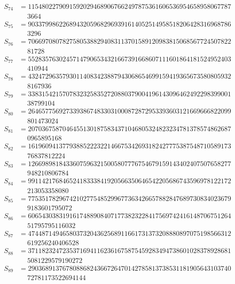 \begin{align*}
S_{74} &= 11548022790915920294689067662497875361606536954658958067787 \\
    &\quad\ 3664\\
S_{75} &= 90337998622689432059682969391614052514958518206428316968786 \\
    &\quad\ 3296\\
S_{76} &= 70669708078275805388294083113701589120983815068567724507822 \\
    &\quad\ 81728\\
S_{77} &= 55283576302457147906534321667391668607111601864181524952403 \\
    &\quad\ 410944\\
S_{78} &= 43247296357930114083423887943068654699159419365673580805932 \\
    &\quad\ 8167936\\
S_{79} &= 33831542157078323258352720880379004196143096462492298399001 \\
    &\quad\ 38799104\\
S_{80} &= 26465775692733938674833031000872872953393603121669666822099 \\
    &\quad\ 801473024\\
S_{81} &= 20703675870464551301875834371046805324823234781378574862687 \\
    &\quad\ 0965895168\\
S_{82} &= 16196094137793885222322146675342693182427775387548710589173 \\
    &\quad\ 76837812224\\
S_{83} &= 12669898184336075963215005807776754679159143402407507658277 \\
    &\quad\ 948210806784\\
S_{84} &= 99114217684652418333841920566350646542205686743596978122172 \\
    &\quad\ 213053358080\\
S_{85} &= 77535178296742102775485299677363426657882847689730834023679 \\
    &\quad\ 9183601795072\\
S_{86} &= 60654303831916174889084071773823228417569742416148706751264 \\
    &\quad\ 51795795116032\\
S_{87} &= 47448714946580373204362568911661731373208880897075198566312 \\
    &\quad\ 619256240406528\\
S_{88} &= 37118232472353716941162361675875459283494738601028378928681 \\
    &\quad\ 5081229579190272\\
S_{89} &= 29036891376780886824366726470142785813738531181905643103740 \\
    &\quad\ 72781173522694144\\
\end{align*}	
